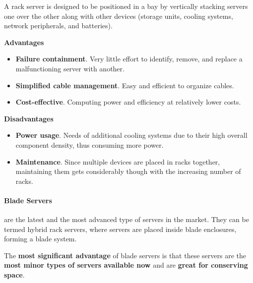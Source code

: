\highspace
A rack server is designed to be positioned in a bay by vertically stacking servers one over the other along with other devices (storage units, cooling systems, network peripherals, and batteries).

\begin{flushleft}
    \textcolor{Green3}{ \textbf{Advantages}}
\end{flushleft}
\begin{itemize}[label=]
    \item \textbf{Failure containment}. Very little effort to identify, remove, and replace a malfunctioning server with another.

    \item \textbf{Simplified cable management}. Easy and efficient to organize cables.

    \item \textbf{Cost-effective}. Computing power and efficiency at relatively lower costs.
\end{itemize}

\begin{flushleft}
    \textcolor{Red2}{ \textbf{Disadvantages}}
\end{flushleft}
\begin{itemize}[label=]
    \item \textbf{Power usage}. Needs of additional cooling systems due to their high overall component density, thus consuming more power.

    \item \textbf{Maintenance}. Since multiple devices are placed in racks together, maintaining them gets considerably though with the increasing number of racks.
\end{itemize}

\newpage

\paragraph{Blade Servers}

 are the latest and the most advanced type of servers in the market. They can be termed hybrid rack servers, where servers are placed inside blade enclosures, forming a blade system.

\highspace
The \textbf{most significant advantage} of blade servers is that these servers are the \textbf{most minor types of servers available now} and are \textbf{great for conserving space}.

